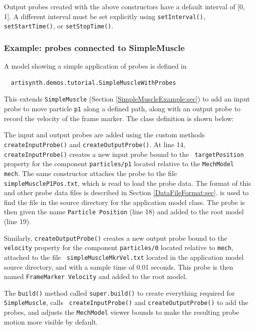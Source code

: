 Output probes created with the above constructors have a default
interval of [0, 1]. A different interval must be set explicitly using
{\tt setInterval()}, {\tt setStartTime()}, or {\tt setStopTime()}.

\subsubsection{Example: probes connected to SimpleMuscle}
\label{SimpleMuscleWithProbes:sec}

A model showing a simple application of probes is defined in
%
\begin{verbatim}
  artisynth.demos.tutorial.SimpleMuscleWithProbes
\end{verbatim}
%
This extends {\tt SimpleMuscle} (Section
\ref{SimpleMuscleExample:sec}) to add an input probe to move
particle {\tt p1} along a defined path, along with an output probe to
record the velocity of the frame marker.  The class definition is
shown below:
%
\lstset{numbers=left}

\lstset{numbers=none}
%
The input and output probes are added using the custom methods {\tt
createInputProbe()} and {\tt createOutputProbe()}. At line 14, {\tt
createInputProbe()} creates a new input probe bound to the {\tt
targetPosition} property for the component {\tt particles/p1} located
relative to the {\tt MechModel} {\tt mech}. The same constructor
attaches the probe to the file {\tt simpleMuscleP1Pos.txt}, which is
read to load the probe data. The format of this and other probe data
files is described in Section \ref{DataFileFormat:sec}.
is used to find the file in the source directory for the application
model class. The probe is then given the name {\tt Particle Position}
(line 18) and added to the root model (line 19).

Similarly, {\tt createOutputProbe()} creates a new output probe bound
to the {\tt velocity} property for the component {\tt particles/0}
located relative to {\tt mech}, attached to the file {\tt
simpleMuscleMkrVel.txt} located in the application model source
directory, and with a sample time of 0.01 seconds. This probe is then
named {\tt FrameMarker Velocity} and added to the root model.

The {\tt build()} method called {\tt super.build()} to create
everything required for {\tt SimpleMuscle}, calls {\tt
createInputProbe()} and {\tt createOutputProbe()} to add the probes,
and adjusts the {\tt MechModel} viewer bounds to make the resulting
probe motion more visible by default.

